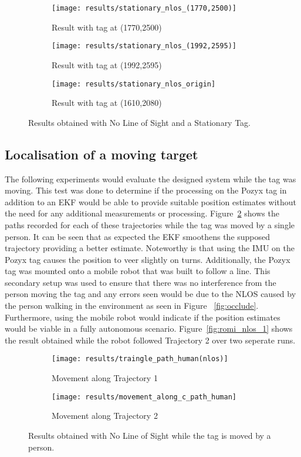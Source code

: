 \begin{figure}[h!]
    \centering
    \begin{subfigure}{0.49\textwidth}
            \texttt{[image: results/stationary\_nlos\_(1770,2500)]}
            \caption{Result with tag at (1770,2500)}
    \end{subfigure}
    \begin{subfigure}{0.49\textwidth}
            \texttt{[image: results/stationary\_nlos\_(1992,2595)]}
            \caption{Result with tag at (1992,2595)}
    \end{subfigure}
    \begin{subfigure}{0.5\textwidth}
            \texttt{[image: results/stationary\_nlos\_origin]}
            \caption{Result with tag at (1610,2080)}
    \end{subfigure}
    \caption{Results obtained with No Line of Sight and a Stationary Tag.}
    \label{fig:stat_anchors}
\end{figure}
\newpage

\subsection{Localisation of a moving target}\label{sec:localisation-of-a-moving-target}
The following experiments would evaluate the designed system while the tag was moving.
This test was done to determine if the processing on the Pozyx tag in addition to an EKF would be able to provide suitable position estimates without the need for any additional measurements or processing.
Figure~\ref{fig:nlos_ppl} shows the paths recorded for each of these trajectories while the tag was moved by a single person.
It can be seen that as expected the EKF smoothens the supposed trajectory providing a better estimate.
Noteworthy is that using the IMU on the Pozyx tag causes the position to veer slightly on turns.
Additionally, the Pozyx tag was mounted onto a mobile robot that was built to follow a line.
This secondary setup was used to ensure that there was no interference from the person moving the tag and any errors seen would be due to the NLOS caused by the person walking in the environment as seen in Figure ~\ref{fig:occlude}.
Furthermore, using the mobile robot would indicate if the position estimates would be viable in a fully autonomous scenario.
Figure~\ref{fig:romi_nlos_1} shows the result obtained while the robot followed Trajectory 2 over two seperate runs.
\begin{figure}[ht!]
    \centering
    \begin{subfigure}{0.7\textwidth}
            \texttt{[image: results/traingle\_path\_human(nlos)]}
            \caption{Movement along Trajectory 1}
    \end{subfigure}
    \begin{subfigure}{0.7\textwidth}
            \texttt{[image: results/movement\_along\_c\_path\_human]}
            \caption{Movement along Trajectory 2}
    \end{subfigure}
    \caption{Results obtained with No Line of Sight while the tag is moved by a person.}
    \label{fig:nlos_ppl}
\end{figure}


